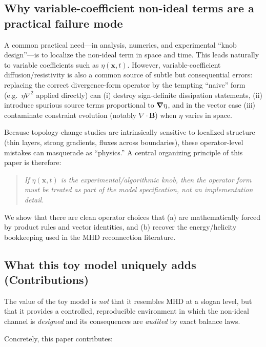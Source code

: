 \documentclass[11pt]{article}
\theoremstyle{plain}
\theoremstyle{definition}
\theoremstyle{remark}
\newcommand{\diver}{\nabla\cdot}
\newcommand{\B}{\mathbf{B}}
\begin{document}
\subsection{Why variable-coefficient non-ideal terms are a practical failure mode}\label{sec:intro_variable_eta}
A common practical need---in analysis, numerics, and experimental ``knob design''---is to localize the non-ideal term in space and time. This leads naturally to variable coefficients such as $\eta(\mathbf{x},t)$. However, variable-coefficient diffusion/resistivity is also a common source of subtle but consequential errors: replacing the correct divergence-form operator by the tempting ``naive'' form (e.g.\ $\eta \nabla^2$ applied directly) can (i) destroy sign-definite dissipation statements, (ii) introduce spurious source terms proportional to $\grad \eta$, and in the vector case (iii) contaminate constraint evolution (notably $\diver \B$) when $\eta$ varies in space.

Because topology-change studies are intrinsically sensitive to localized structure (thin layers, strong gradients, fluxes across boundaries), these operator-level mistakes can masquerade as ``physics.'' A central organizing principle of this paper is therefore:
\begin{quote}
\emph{If $\eta(\mathbf{x},t)$ is the experimental/algorithmic knob, then the operator form must be treated as part of the model specification, not an implementation detail.}
\end{quote}
We show that there are clean operator choices that (a) are mathematically forced by product rules and vector identities, and (b) recover the energy/helicity bookkeeping used in the MHD reconnection literature.

\subsection{What this toy model uniquely adds (Contributions)}\label{sec:intro_contributions}
The value of the toy model is \emph{not} that it resembles MHD at a slogan level, but that it provides a controlled, reproducible environment in which the non-ideal channel is \emph{designed} and its consequences are \emph{audited} by exact balance laws.

Concretely, this paper contributes:
\end{document}
